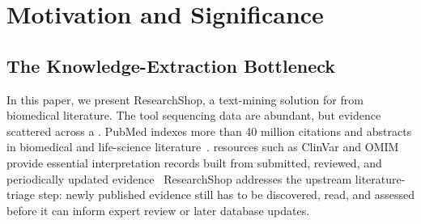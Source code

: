 \section{Motivation and Significance}
\label{sec:motivation}

\subsection{The Knowledge-Extraction Bottleneck}

In this paper, we present ResearchShop, a text-mining solution for \DIFdelbegin {}\DIFdelend{} \DIFaddbegin {}\DIFaddend{} from biomedical literature. The tool \DIFdelbegin {}\DIFdelend{} \DIFaddbegin {}\DIFaddend{} sequencing data are abundant, but \DIFdelbegin {}\DIFdelend{} \DIFaddbegin {}\DIFaddend{} evidence scattered across a \DIFdelbegin {}\DIFdelend{} \DIFaddbegin {}\DIFaddend . PubMed indexes more than 40 million citations and abstracts in biomedical and life-science literature~\cite{pubmed_about_2026}. \DIFdelbegin {}\DIFdelend{} \DIFaddbegin {}\DIFaddend{} resources such as ClinVar and OMIM provide essential interpretation records built from submitted, reviewed, and periodically updated evidence~\cite{landrum2025clinvar,amberger2015omim}\DIFdelbegin \DIFdel{, }\DIFdelend{} \DIFaddbegin {}\DIFaddend{} ResearchShop addresses the upstream literature-triage step: newly published evidence still has to be discovered, read, and assessed before it can inform expert review or later database updates.
\DIFdelbegin {}\DIFdelend 

